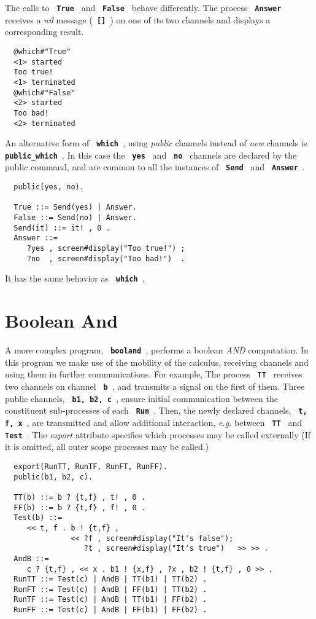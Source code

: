 \documentclass[twoside,10pt]{report}
\begin{document}
The calls to {\bf \verb+ True +} and {\bf \verb+ False +} behave differently.
The process {\bf \verb+ Answer +} \linebreak
receives a {\em nil} message ({\bf \verb+ [] +}) on one
of its two channels and displays a corresponding result.

\begin{verbatim}
  @which#"True"
  <1> started
  Too true!
  <1> terminated
  @which#"False"
  <2> started
  Too bad!
  <2> terminated
\end{verbatim}

\noindent
An alternative form of {\bf \verb+ which +}, using {\em public} channels
instead of {\em new} channels is {\bf \verb+ public_which +}. In this case the
{\bf \verb+ yes +} and {\bf \verb+ no +} channels are declared by the public
command, and are common to all the instances of {\bf \verb+ Send +}
and {\bf \verb+ Answer +}.

\begin{verbatim}
  public(yes, no).

  True ::= Send(yes) | Answer.
  False ::= Send(no) | Answer.
  Send(it) ::= it! , 0 .
  Answer ::=
     ?yes , screen#display("Too true!") ;
     ?no  , screen#display("Too bad!")  .
\end{verbatim}

\noindent
It has the same behavior as {\bf \verb+ which +}.

\section{Boolean And}
\label{booland}

A more complex program, {\bf \verb+ booland +}, performs a boolean {\em AND}
computation.  In this program we make use of the mobility of the
calculus, receiving channels and using them in further
communications. For example, The process {\bf \verb+ TT +} receives two
channels on channel {\bf \verb+ b +}, and transmits a signal on the first
of them. Three public channels, {\bf \verb+ b1, b2, c +}, ensure initial
communication between the constituent sub-processes of each 
{\bf \verb+ Run +}. Then, the  newly declared channels, {\bf \verb+ t, f, x +},
are transmitted and allow additional interaction, {\em e.g.} between
{\bf \verb+ TT +} and {\bf \verb+ Test +}.  The {\em export}
attribute specifies which processes may be called externally (If it is omitted,
all outer scope processes may be called.)

{\samepage
\begin{verbatim}
  export(RunTT, RunTF, RunFT, RunFF).
  public(b1, b2, c).

  TT(b) ::= b ? {t,f} , t! , 0 .
  FF(b) ::= b ? {t,f} , f! , 0 .
  Test(b) ::=
     << t, f . b ! {t,f} , 
               << ?f , screen#display("It's false");
                  ?t , screen#display("It's true")   >> >> .
  AndB ::=
     c ? {t,f} , << x . b1 ! {x,f} , ?x , b2 ! {t,f} , 0 >> .
  RunTT ::= Test(c) | AndB | TT(b1) | TT(b2) .
  RunFT ::= Test(c) | AndB | FF(b1) | TT(b2) .
  RunTF ::= Test(c) | AndB | TT(b1) | FF(b2) .
  RunFF ::= Test(c) | AndB | FF(b1) | FF(b2) .
\end{verbatim}
}
\end{document}

